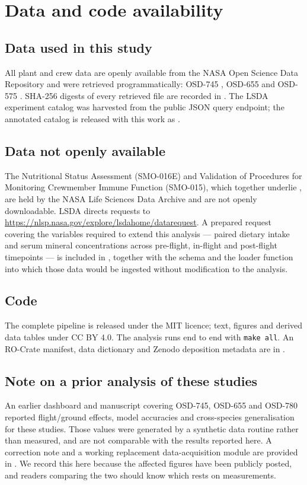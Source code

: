 \section{Data and code availability}
\label{sec:availability}

\subsection{Data used in this study}

All plant and crew data are openly available from the NASA Open Science Data
Repository and were retrieved programmatically:
OSD-745 \citep{osdr745}, OSD-655 \citep{osdr655} and OSD-575 \citep{osdr575}.
SHA-256 digests of every retrieved file are recorded in
. The LSDA experiment catalog \citep{lsda} was
harvested from the public JSON query endpoint; the annotated catalog is
released with this work as .

\subsection{Data not openly available}

The Nutritional Status Assessment (SMO-016E) and Validation of Procedures for
Monitoring Crewmember Immune Function (SMO-015), which together underlie
\citet{zheng2023}, are held by the NASA Life Sciences Data Archive and are not
openly downloadable. LSDA directs requests to
\url{https://nlsp.nasa.gov/explore/lsdahome/datarequest}. A prepared request
covering the variables required to extend this analysis --- paired dietary
intake and serum mineral concentrations across pre-flight, in-flight and
post-flight timepoints --- is included in , together with
the schema and the loader function into which those data would be ingested
without modification to the analysis.

\subsection{Code}

The complete pipeline is released under the MIT licence; text, figures and
derived data tables under CC BY 4.0. The analysis runs end to end with
\texttt{make all}. An RO-Crate manifest, data dictionary and Zenodo deposition
metadata are in .

\subsection{Note on a prior analysis of these studies}

An earlier dashboard and manuscript covering OSD-745, OSD-655 and OSD-780
reported flight/ground effects, model accuracies and cross-species
generalisation for these studies. Those values were generated by a synthetic
data routine rather than measured, and are not comparable with the results
reported here. A correction note and a working replacement data-acquisition
module are provided in . We record this here because
the affected figures have been publicly posted, and readers comparing the two
should know which rests on measurements.
